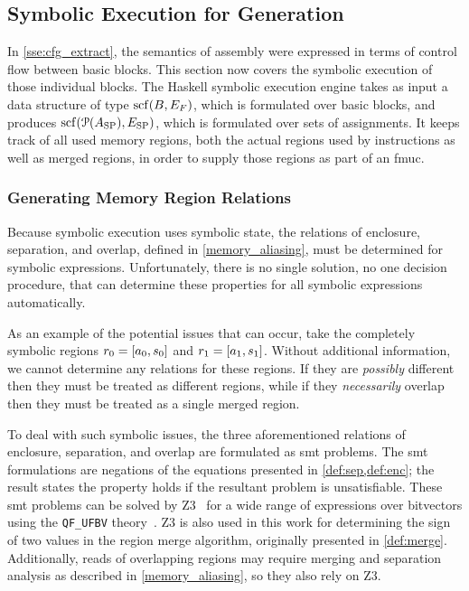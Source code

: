 \subsection{Symbolic Execution for Generation}\label{sse:syntax_symb}
In \cref{sse:cfg_extract}, the semantics of assembly were expressed%
in terms of control flow between basic blocks.
This section now covers the symbolic execution of those individual blocks.
The Haskell symbolic execution engine
takes as input a data structure of type $\operatorname{scf}(B,E_F)$,
which is formulated over basic blocks,
and produces $\operatorname{scf}(\operatorname{\mathcal{P}}(A_\mathrm{SP}),E_\mathrm{SP})$,%
which is formulated over sets of assignments.
It keeps track of all used memory regions,
both the actual regions used by instructions as well as merged regions,
in order to supply those regions as part of an \ac{fmuc}.

\subsubsection{Generating Memory Region Relations}
Because symbolic execution uses symbolic state,
the relations of enclosure, separation, and overlap,
defined in \cref{memory_aliasing}, must be determined for symbolic expressions.
Unfortunately, there is no single solution, no one decision procedure,
that can determine these properties for all symbolic expressions automatically.

As an example of the potential issues that can occur,
take the completely symbolic regions $r_0=[a_0,s_0]$
and $r_1=[a_1,s_1]$.
Without additional information, we cannot determine any relations for these regions.
If they are \emph{possibly} different then they must be treated as different regions,
while if they \emph{necessarily} overlap
then they must be treated as a single merged region.

To deal with such symbolic issues,
the three aforementioned relations of enclosure, separation, and overlap
are formulated as \ac{smt} problems.
The \ac{smt} formulations are negations
of the equations presented in \cref{def:sep,def:enc};
the result states the property holds if the resultant problem is unsatisfiable.
These \ac{smt} problems can be solved by Z3~\citep{de2008z3}
for a wide range of expressions over bitvectors
using the \texttt{QF\_UFBV} theory~\citep{barrett2017smt}.
Z3 is also used in this work for determining the sign of two values
in the region merge algorithm, originally presented in \cref{def:merge}.
Additionally, reads of overlapping regions may require merging
and separation analysis as described in \cref{memory_aliasing},
so they also rely on Z3.

